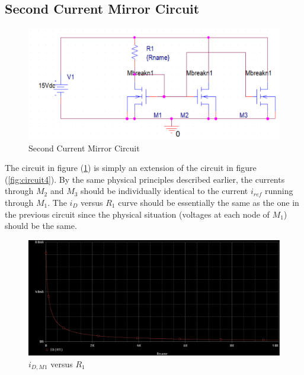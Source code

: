 \subsection{Second Current Mirror Circuit}

\FloatBarrier

\begin{figure}[h!]
	\centering
	\includegraphics[scale=0.75]{./images/circuit5.PNG}
	\caption{Second Current Mirror Circuit}
	\label{fig:circuit5}
\end{figure}

\FloatBarrier

The circuit in figure (\ref{fig:circuit5}) is simply an extension of the circuit in figure (\ref{fig:circuit4}). By the same physical principles described earlier, the currents through $M_2$ and $M_3$ should be individually identical to the current $i_{ref}$ running through $M_1$. The $i_D$ versus $R_1$ curve should be essentially the same as the one in the previous circuit since the physical situation (voltages at each node of $M_1$) should be the same.

\FloatBarrier

\begin{figure}[h!]
	\centering
	\includegraphics[scale=0.5]{./images/circuit5_r_sweep.PNG}
	\caption{$i_{D,M1}$ versus $R_1$}
	\label{fig:circuit5_id1_vs_r}
\end{figure}

